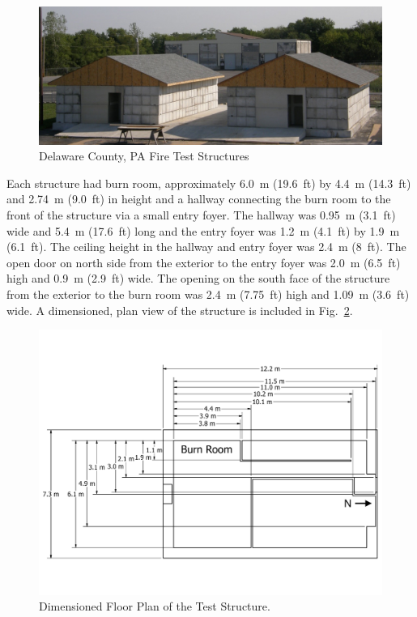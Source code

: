 \documentclass[12pt,oneside]{book}
\begin{document}
\begin{figure}[!ht]
	\includegraphics[width=6in]{../Figures/Pictures/DelCo_Structures}
	\caption{Delaware County, PA Fire Test Structures}
	\label{fig:Delaware_County,_PA_Fire_Test_Structures}
\end{figure}

Each structure had burn room, approximately 6.0~m (19.6~ft) by 4.4~m (14.3~ft) and 2.74~m (9.0~ft) in height and a hallway connecting the burn room to the front of the structure via a small entry foyer. The hallway was 0.95~m (3.1~ft) wide and 5.4~m (17.6~ft) long and the entry foyer was 1.2~m (4.1~ft) by 1.9~m (6.1~ft). The ceiling height in the hallway and entry foyer was 2.4~m (8~ft).  The open door on north side from the exterior to the entry foyer was 2.0~m (6.5~ft) high and 0.9~m (2.9~ft) wide. The opening on the south face of the structure from the exterior to the burn room was 2.4~m (7.75~ft) high and 1.09~m (3.6~ft) wide. A dimensioned, plan view of the structure is included in Fig.~\ref{fig:Test_Structure_Floor_Plan}.

\begin{figure}[!ht]
	\includegraphics[width=\columnwidth]{../Figures/Floor_Plans/PDFs/East_Structure/DelCo_2012_East_Structure_Plain}
	\caption{Dimensioned Floor Plan of the Test Structure.}
	\label{fig:Test_Structure_Floor_Plan}
\end{figure}
\end{document}
